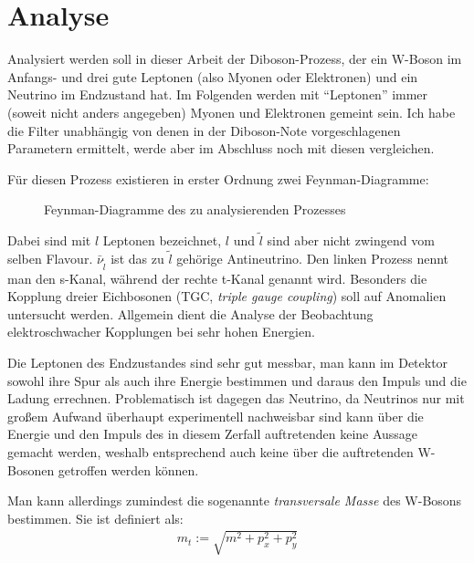 \section{Analyse}
\label{cha:analyse}
Analysiert werden soll in dieser Arbeit der Diboson-Prozess, der ein W-Boson im
Anfangs- und drei gute Leptonen (also Myonen oder Elektronen) und ein Neutrino
im Endzustand hat. Im Folgenden werden mit "`Leptonen"' immer (soweit nicht
anders angegeben) Myonen und Elektronen gemeint sein. Ich habe die Filter
unabhängig von denen in der Diboson-Note vorgeschlagenen
Parametern\cite{diboson-ana} ermittelt, werde aber im Abschluss noch mit diesen
vergleichen.

Für diesen Prozess existieren in erster Ordnung zwei Feynman-Diagramme:
\begin{figure}[h!]
  \begin{minipage}{0.49\textwidth}
    \centering
    
  \end{minipage}
  \begin{minipage}{0.49\textwidth}
    \centering
    
  \end{minipage}
  \caption{Feynman-Diagramme des zu analysierenden Prozesses}
  \label{fig:feynman}
\end{figure}
Dabei sind mit $l$ Leptonen bezeichnet, $l$ und $\tilde l$ sind aber nicht
zwingend vom selben Flavour. $\bar \nu_{\tilde l}$ ist das zu $\tilde l$
gehörige Antineutrino. Den linken Prozess nennt man den s-Kanal, während der
rechte t-Kanal genannt wird. Besonders die Kopplung dreier Eichbosonen
(TGC, \emph{triple gauge coupling}) soll auf Anomalien untersucht werden.
Allgemein dient die Analyse der Beobachtung elektroschwacher Kopplungen bei sehr
hohen Energien.

Die Leptonen des Endzustandes sind sehr gut messbar, man kann im Detektor sowohl
ihre Spur als auch ihre Energie bestimmen und daraus den Impuls und die Ladung
errechnen.  Problematisch ist dagegen das Neutrino, da Neutrinos nur mit großem
Aufwand überhaupt experimentell nachweisbar sind\cite{needed} kann über die
Energie und den Impuls des in diesem Zerfall auftretenden keine Aussage gemacht
werden, weshalb entsprechend auch keine über die auftretenden W-Bosonen
getroffen werden können.

\label{cha:met}
Man kann allerdings zumindest die sogenannte \emph{transversale Masse} des
W-Bosons bestimmen. Sie ist definiert als:
\begin{align}
  m_t := \sqrt{m^2 + p_x^2 + p_y^2}
  \label{def:trans}
\end{align}

